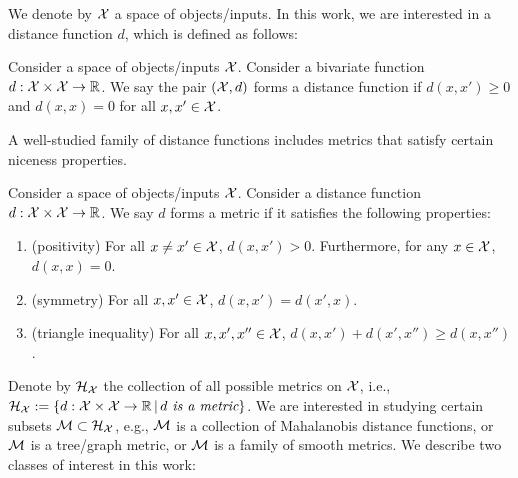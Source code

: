 We denote by ${\mathcal{X}}$ a space of objects/inputs. In this work, we are interested in a distance function \(d\), which is defined as follows:


\begin{definition} Consider a space of objects/inputs \({\mathcal{X}}\). Consider a bivariate function \(d: {\mathcal{X}} \times {\mathcal{X}} \to \mathbb{R}\). We say the pair \(({\mathcal{X}}, d)\) forms a distance function if 
$d(x,x') \geq 0$ and $d(x,x) = 0$ for all $x, x' \in {\mathcal{X}}$.    
\end{definition}
A well-studied family of distance functions includes metrics that satisfy certain niceness properties.
\begin{definition}[metric]
    Consider a space of objects/inputs \({\mathcal{X}}\). Consider a distance function \(d: {\mathcal{X}} \times {\mathcal{X}} \to \mathbb{R}\). We say \(d\) forms a metric if it satisfies the following properties:
    \begin{enumerate}
        \item (positivity) For all \(x \neq x' \in {\mathcal{X}}\), \(d(x, x') > 0\). Furthermore, for any \(x \in {\mathcal{X}}\), \(d(x, x) = 0\). 
        \item (symmetry) For all \(x, x' \in {\mathcal{X}}\), \(d(x, x') = d(x', x)\).
        \item (triangle inequality) For all \(x, x', x'' \in {\mathcal{X}}\), \(d(x, x') + d(x', x'') \ge d(x, x'')\).
    \end{enumerate}
\end{definition}

Denote by \({\mathcal{H}}_{{\mathcal{X}}}\) the collection of all possible metrics on \({\mathcal{X}}\), i.e., \({\mathcal{H}}_{{\mathcal{X}}} := \{d: {\mathcal{X}} \times {\mathcal{X}} \to \mathbb{R} \, |\, d \textit{ is a metric}\}\). We are interested in studying certain subsets \({\mathcal{M}} \subset {\mathcal{H}}_{{\mathcal{X}}}\), e.g., \({\mathcal{M}}\) is a collection of Mahalanobis distance functions, or \({\mathcal{M}}\) is a tree/graph metric, or \({\mathcal{M}}\) is a family of smooth metrics. We describe two classes of interest in this work:

